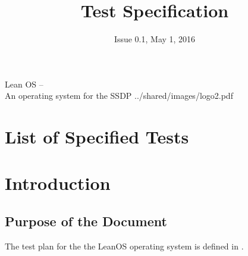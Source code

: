 

\title{Test Specification}
\def \documentid {LEANOS-UVIE-TS-001}
\date{Issue 0.1, May 1, 2016}

\newcommand\affil[1]{\textsuperscript#1}

\def\preparedby {Armin Luntzer\affil{1}}
\def\checkedby {Roland Ottensamer\affil{1}}
\def\approvedby {Franz Kerschbaum\affil{1}}

\def\affiliations{
	\affil{1} Department of Astrophysics, University of Vienna
}







\usepackage{enumitem}
\usepackage{vhistory}

\usepackage{biblatex}







\rereadauxdesignlabels





\setmainfont{MyriadPro-SemiCondensed}
\uvietitlepage%
{Lean OS --\\ An operating system for the SSDP}%
{\doctitle}%
{../shared/images/logo2.pdf}
\setmainfont{MyriadPro}

\approvalpage

\tableofcontents
\newpage


\chapter*{List of Specified Tests}
\label{listoftests}
\the\designlist


\begin{versionhistory}
\end{versionhistory}


\chapter{Introduction}


\section{Purpose of the Document}

The test plan for the the LeanOS operating system is defined in
\cite{leanosTP}.\\
\\

